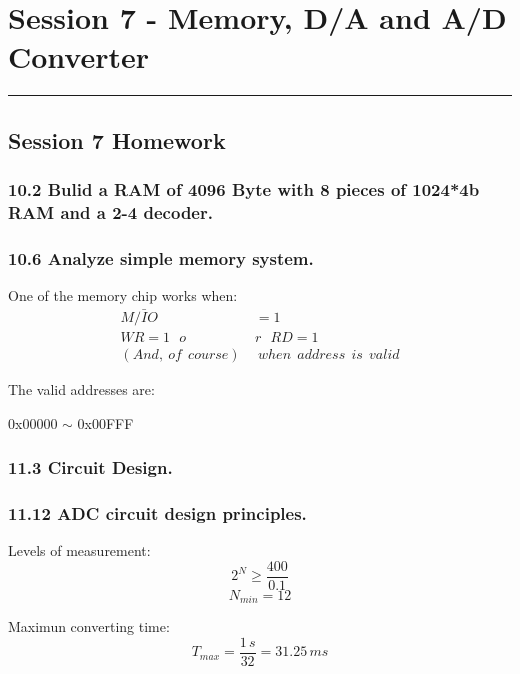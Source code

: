 \section{Session 7 - Memory, D/A and A/D Converter}
\vspace{-15pt}\noindent\rule{\textwidth}{0.1pt}\vspace{-10pt}
    \subsection*{Session 7 Homework}
    \subsubsection{10.2 \textnormal{Bulid a RAM of 4096 Byte with 8 pieces of 1024*4b RAM and a 2-4 decoder}.}
    {\color{hwSolution}
        
    }

    \subsubsection{10.6 \textnormal{Analyze simple memory system}.}
    {\color{hwSolution}

    One of the memory chip works when:
    \begin{align*}
        M/\bar{I}O &= 1\\
        WR = 1~~~o&r~~~RD = 1\\
        (And,~of~~course)~&~when~~address~~is~~valid
    \end{align*}

    The valid addresses are:
    \begin{center}
        0x00000 $\sim$ 0x00FFF
    \end{center}

    }

    \subsubsection{11.3 \textnormal{Circuit Design}.}
    {\color{hwSolution}
        
    }

    \subsubsection{11.12 \textnormal{ADC circuit design principles}.}
    {\color{hwSolution}

        Levels of measurement:
        \[
            2^N \geq \frac{400}{0.1}
        \]\[
            N_{min} = 12
        \]

        Maximun converting time:
        \[
            T_{max} = \frac{1\,s}{32} = 31.25\,ms
        \]

    }
